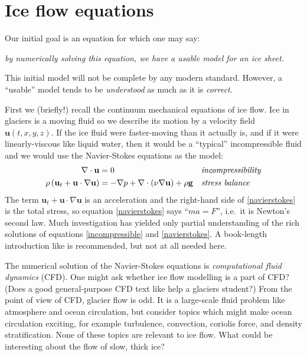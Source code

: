 \documentclass[letterpaper,final,12pt,reqno]{amsart}
\begin{document}
\section{Ice flow equations}  \label{sec:continuum}

Our initial goal is an equation for which one may say:
\begin{center}
\emph{by numerically solving this equation, we have a usable model for an ice sheet.}
\end{center}
\noindent This initial model will not be complete by any modern standard.  However, a ``usable'' model tends to be \emph{understood} as much as it is \emph{correct}.

First we (briefly!) recall the continuum mechanical equations of ice flow.  Ice in glaciers is a moving fluid so we describe its motion by a velocity field $\mathbf{u}(t,x,y,z)$.  If the ice fluid were faster-moving than it actually is, and if it were linearly-viscous like liquid water, then it would be a ``typical'' incompressible fluid and we would use the Navier-Stokes equations as the model:
\begin{align}
\nabla \cdot \mathbf{u} &= 0 &&\text{\emph{incompressibility}} \label{incompressible} \\
\rho \left(\mathbf{u}_t + \mathbf{u}\cdot\nabla \mathbf{u}\right) &= -\nabla p + \nabla \cdot (\nu \nabla \mathbf{u}) + \rho \mathbf{g} &&\text{\emph{stress balance}} \label{navierstokes}
\end{align}
The term $\mathbf{u}_t + \mathbf{u}\cdot\nabla \mathbf{u}$ is an acceleration and the right-hand side of \eqref{navierstokes} is the total stress, so equation \eqref{navierstokes} says ``$ma=F$'', i.e.~it is Newton's second law.  Much investigation has yielded only partial understanding of the rich solutions of equations \eqref{incompressible} and \eqref{navierstokes}.  A book-length introduction like \cite{Acheson} is recommended, but not at all needed here.

The numerical solution of the Navier-Stokes equations is \emph{computational fluid dynamics} (CFD).  One might ask whether ice flow modelling is a part of CFD?  (Does a good general-purpose CFD text like \cite{Wesseling} help a glaciers student?)  From the point of view of CFD, glacier flow is odd.  It is a large-scale fluid problem like atmosphere and ocean circulation, but consider topics which might make ocean circulation exciting, for example turbulence, convection, coriolis force, and density stratification.  None of these topics are relevant to ice flow.  What could be interesting about the flow of slow, thick ice?
\end{document}
